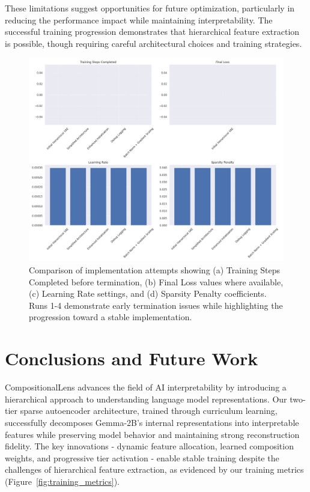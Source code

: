 \documentclass{article} %
\begin{document}
These limitations suggest opportunities for future optimization, particularly in reducing the performance impact while maintaining interpretability. The successful training progression demonstrates that hierarchical feature extraction is possible, though requiring careful architectural choices and training strategies.

\begin{figure}[t]
    \centering
    \includegraphics[width=\textwidth]{final_metrics.png}
    \caption{Comparison of implementation attempts showing (a) Training Steps Completed before termination, (b) Final Loss values where available, (c) Learning Rate settings, and (d) Sparsity Penalty coefficients. Runs 1-4 demonstrate early termination issues while highlighting the progression toward a stable implementation.}
    \label{fig:final_metrics}
\end{figure}



\section{Conclusions and Future Work}
\label{sec:conclusion}

CompositionalLens advances the field of AI interpretability by introducing a hierarchical approach to understanding language model representations. Our two-tier sparse autoencoder architecture, trained through curriculum learning, successfully decomposes Gemma-2B's internal representations into interpretable features while preserving model behavior and maintaining strong reconstruction fidelity. The key innovations - dynamic feature allocation, learned composition weights, and progressive tier activation - enable stable training despite the challenges of hierarchical feature extraction, as evidenced by our training metrics (Figure~\ref{fig:training_metrics}).
\end{document}
